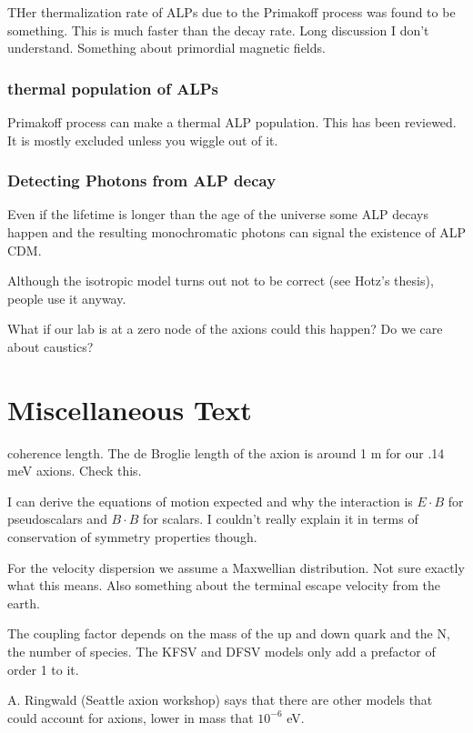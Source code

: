 \documentclass[11pt]{book}
\begin{document}
THer thermalization rate of ALPs due to the Primakoff process was found to be something. This is much faster than the decay rate. Long discussion I don't understand. Something about primordial magnetic fields.

\subsubsection{thermal population of ALPs}

Primakoff process can make a thermal ALP population. This has been reviewed. It is mostly excluded unless you wiggle out of it.

\subsubsection{Detecting Photons from ALP decay}

Even if the lifetime is longer than the age of the universe some ALP decays happen and the resulting monochromatic photons can signal the existence of ALP CDM.

Although the isotropic model turns out not to be correct (see Hotz's thesis), people use it anyway.

What if our lab is at a zero node of the axions could this happen? Do we care about caustics?

\section{Miscellaneous Text}

coherence length. The de Broglie length of the axion is around 1 m for our .14 meV axions. Check this.

I can derive the equations of motion expected and why the interaction is $E\cdot B$ for pseudoscalars and $B\cdot B$ for scalars. I couldn't really explain it in terms of conservation of symmetry properties though.

For the velocity dispersion we assume a Maxwellian distribution. Not sure exactly what this means. Also something about the terminal escape velocity from the earth.


The coupling factor depends on the mass of the up and down quark and the N, the number of species. The KFSV and DFSV models only add a prefactor of order 1 to it.

A. Ringwald (Seattle axion workshop) says that there are other models that could account for axions, lower in mass that $10^{-6}$ eV.
\end{document}
